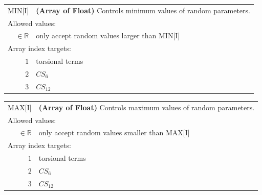 \documentclass[10pt,a4paper]{report}
\numberwithin{equation}{section}
\begin{document}
{
\begin{tabular}{r@{ : }l}
\label{descr:min}
       MIN[I]&\textbf{(Array of Float)} Controls minimum values of random parameters.                                                       \\ 
\multicolumn{2}{l}{Allowed values:} \\ 
\(\in\mathbb{R}\)&only accept random values larger than MIN[I]                                                                          \\ 
\multicolumn{2}{l}{Array index targets:} \\ 
     \(1\)&torsional terms                                                                                      \\ 
     \(2\)&$CS_6$                                                                                               \\ 
     \(3\)&$CS_{12}$                                                                                            \\ 
\end{tabular}
\vspace{1ex}
}

{
\begin{tabular}{r@{ : }l}
\label{descr:max}
       MAX[I]&\textbf{(Array of Float)} Controls maximum values of random parameters.                                                       \\ 
\multicolumn{2}{l}{Allowed values:} \\ 
\(\in\mathbb{R}\)&only accept random values smaller than MAX[I]                                                                          \\ 
\multicolumn{2}{l}{Array index targets:} \\ 
     \(1\)&torsional terms                                                                                      \\ 
     \(2\)&$CS_6$                                                                                               \\ 
     \(3\)&$CS_{12}$                                                                                            \\ 
\end{tabular}
\vspace{1ex}
}
\end{document}
